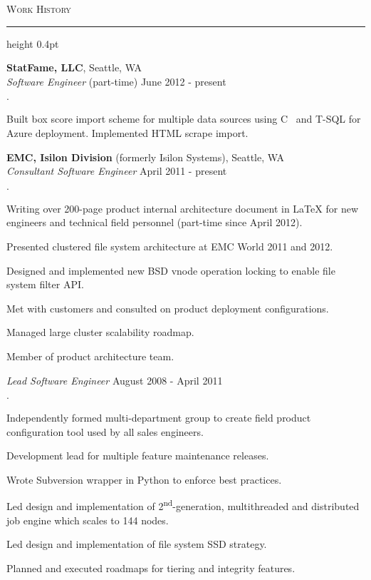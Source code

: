 \documentclass[10pt]{article}
\newcommand{\myline}{\par
  \kern3pt %
  \hrule height 0.4pt
  \kern3pt %
}
\newcommand{\header}[1]{\textsc{\large #1} \myline}
\newenvironment{achievements}{\begin{list}{\bf \Large $\cdot$}{\topsep 2pt \itemsep 0pt}}{\vspace*{4pt}\end{list}}
\DeclareRobustCommand{\csharplogo}{\hbox{C\hspace{-0.5ex}
    \protect\raisebox{0.5ex}
    {\protect\scalebox{0.67}{\#}}}}
\begin{document}
\smallskip

\header{Work History}

{\bf StatFame, LLC}, Seattle, WA \\
{\em Software Engineer} (part-time) \hfill June 2012 - present
\begin{achievements}
\item Built box score import scheme for multiple data sources using
  \csharplogo{} and T-SQL for Azure deployment.  Implemented HTML scrape import.
\end{achievements}

{\bf EMC, Isilon Division} (formerly Isilon Systems), Seattle, WA \\
  {\em Consultant Software Engineer} \hfill April 2011 - present
  \begin{achievements}
  \item Writing over 200-page product internal architecture document in
    \LaTeX{} for new engineers and technical field personnel (part-time since
    April 2012).
  \item Presented clustered file system architecture at EMC World 2011 and 2012.
  \item Designed and implemented new BSD vnode operation locking to enable
    file system filter API.
  \item Met with customers and consulted on product deployment configurations.
  \item Managed large cluster scalability roadmap.
  \item Member of product architecture team.
  \end{achievements}

  {\em Lead Software Engineer} \hfill August 2008 - April 2011
  \begin{achievements}
  \item Independently formed multi-department group to create field product
    configuration tool used by all sales engineers.
  \item Development lead for multiple feature maintenance releases.
  \item Wrote Subversion wrapper in Python to enforce best practices.
  \item Led design and implementation of 2\textsuperscript{nd}-generation, multithreaded
    and distributed job engine which scales to 144 nodes.
  \item Led design and implementation of file system SSD strategy.
  \item Planned and executed roadmaps for tiering and integrity features.
  \end{achievements}
\end{document}
